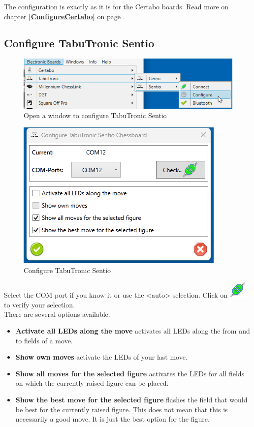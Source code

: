 \documentclass[11pt,a4paper]{article}
\begin{document}
The configuration is exactly as it is for the Certabo boards.
Read more on chapter \textbf{\ref{ConfigureCertabo}  } on page \pageref{ConfigureCertabo}.

\subsection{Configure TabuTronic Sentio} \label{ConfigureTabuTronicSentio}

\begin{figure}[H]
	\centering
	\includegraphics[scale=0.8]{Sentio1.png}
	\caption{Open a window to configure TabuTronic Sentio }
	\label{fig:Sentio1}
\end{figure}


\begin{figure}[H]
	\centering
	\includegraphics[scale=1.0]{Sentio2.png}
	\caption{Configure TabuTronic Sentio}
	\label{fig:Sentio2}
\end{figure}

Select the COM port if you know it or use the <auto> selection. 
Click on \includegraphics[scale=0.5]{connect.png} to verify your selection.\\
There are several options available.
\begin{itemize}
	\item \textbf{Activate all LEDs along the move} activates all LEDs along the from and to fields of a move.
	\item \textbf{Show own moves} activate the LEDs of your last move.
	\item \textbf{Show all moves for the selected figure} activates the LEDs for all fields on which the currently raised figure can be placed.
	\item \textbf{Show the best move for the selected figure} flashes the field that would be best for the currently raised figure. This does not mean that this is necessarily a good move. It is just the best option for the figure.
\end{itemize}
\end{document}
